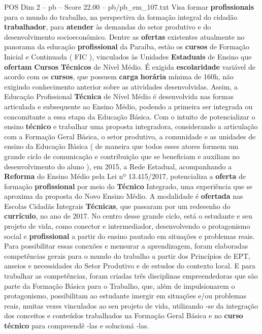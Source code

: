 \begin{textsample}{POS Dim 2 – pb – Score 22.00 – pb/pb\_em\_107.txt}
Visa formar \textbf{profissionais} para o mundo do trabalho, na perspectiva da formação integral do cidadão \textbf{trabalhador}, para \textbf{atender} às demandas do setor produtivo e do desenvolvimento socioeconômico.
Dentre as \textbf{ofertas} existentes atualmente no panorama da educação \textbf{profissional} da Paraíba, estão os \textbf{cursos} de Formação Inicial e Continuada ( FIC ), vinculados às Unidades \textbf{Estaduais} de Ensino que \textbf{ofertam} \textbf{Cursos} \textbf{Técnicos} de Nível Médio.
É exigida \textbf{escolaridade} variável de acordo com os \textbf{cursos}, que possuem \textbf{carga} \textbf{horária} mínima de 160h, não exigindo conhecimento anterior sobre as atividades desenvolvidas.
Assim, a Educação Profissional \textbf{Técnica} de Nível Médio é desenvolvida nas formas articulada e subsequente ao Ensino Médio, podendo a primeira ser integrada ou concomitante a essa etapa da Educação Básica.
Com o intuito de potencializar o ensino \textbf{técnico} e trabalhar uma proposta integradora, considerando a articulação com a Formação Geral Básica, o setor produtivo, a comunidade e as unidades de ensino da Educação Básica ( de maneira que todos esses atores formem um grande ciclo de comunicação e contribuição que se beneficiam e auxiliam no desenvolvimento do aluno ), em 2015, a Rede Estadual, acompanhando a \textbf{Reforma} do Ensino Médio pela Lei nº 13.415/2017, potencializa a \textbf{oferta} de formação \textbf{profissional} por meio do \textbf{Técnico} Integrado, uma experiência que se aproxima da proposta do Novo Ensino Médio.
A modalidade é \textbf{ofertada} nas Escolas Cidadãs Integrais \textbf{Técnicas}, que passaram por um redesenho do \textbf{currículo}, no ano de 2017.
No centro desse grande ciclo, está o estudante e seu projeto de vida, como conector e intermediador, desenvolvendo o protagonismo social e \textbf{profissional} a partir do ensino pautado em situações e problemas reais.
Para possibilitar essas conexões e mensurar a aprendizagem, foram elaboradas competências gerais para o mundo do trabalho a partir dos Princípios de EPT, anseios e necessidades do Setor Produtivo e de estudos do contexto local.
E para trabalhar as competências, foram criadas três disciplinas empreendedoras que são parte da Formação Básica para o Trabalho, que, além de impulsionarem o protagonismo, possibilitam ao estudante imergir em situações e/ou problemas reais, muitas vezes vinculados ao seu projeto de vida, utilizando -se da integração dos conceitos e conteúdos trabalhados na Formação Geral Básica e no \textbf{curso} \textbf{técnico} para compreendê -las e solucioná -las.

\end{textsample}

